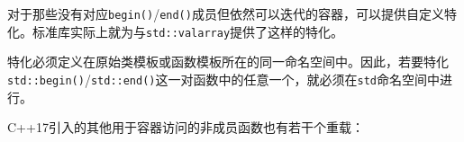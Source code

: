 对于那些没有对应\texttt{begin()}/\texttt{end()}成员但依然可以迭代的容器，可以提供自定义特化。标准库实际上就为与\texttt{std::\allowbreak{}valarray}提供了这样的特化。



\begin{myNote}[tip]
特化必须定义在原始类模板或函数模板所在的同一命名空间中。因此，若要特化\texttt{std::\allowbreak{}begin()}/\texttt{std::\allowbreak{}end()}这一对函数中的任意一个，就必须在\texttt{std}命名空间中进行。
\end{myNote}



C++17引入的其他用于容器访问的非成员函数也有若干个重载：



